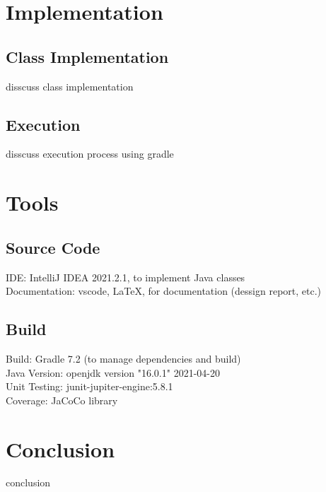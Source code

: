 \documentclass[12pt, dvipsnames, a4paper]{article}
\begin{document}
\clearpage

\section{Implementation}
\subsection{Class Implementation}
disscuss class implementation
\subsection{Execution}
disscuss execution process using gradle
\section{Tools}
\subsection{Source Code}
IDE: IntelliJ IDEA 2021.2.1, to implement Java classes\\
Documentation: vscode, \LaTeX, for documentation (dessign report, etc.)
\subsection{Build}
Build: Gradle 7.2 (to manage dependencies and build)\\
Java Version: openjdk version "16.0.1" 2021-04-20\\
Unit Testing: junit-jupiter-engine:5.8.1\\
Coverage: JaCoCo library
\section{Conclusion}
conclusion
\end{document}
